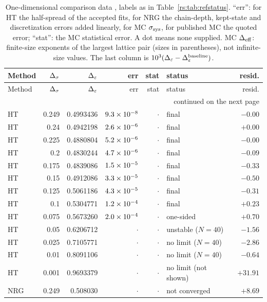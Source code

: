 {\small
\begin{longtable}{@{}l r r r r l r@{}}
\caption{One-dimensional comparison data \cite{rs:noteHT,rs:noteNRG,rs:noteMC,rs:Uzelac:2001lc,rs:Angelini:2014koy},
labels as in Table~\ref{rs:tab:refstatus}. ``err'': for HT the half-spread of the accepted fits,
for NRG the chain-depth, kept-state and discretization errors added linearly, for MC
$\sigma_{\rm sys}$, for published MC the quoted error; ``stat'': the MC statistical error. A dot
means none supplied. MC $\Delta_{\rm eff}$: finite-size exponents of the largest lattice pair
(sizes in parentheses), not infinite-size values. The last column is
$10^3(\Delta_\varepsilon-\Delta_\varepsilon^{\rm baseline})$.}\label{rs:tab:refs1d}\\
\toprule Method & $\Delta_\sigma$ & $\Delta_\varepsilon$ & err & stat & status & resid.\\ \midrule\endfirsthead
\toprule Method & $\Delta_\sigma$ & $\Delta_\varepsilon$ & err & stat & status & resid.\\ \midrule\endhead
\midrule\multicolumn{7}{r}{continued on the next page}\\\endfoot
\bottomrule\endlastfoot
HT & 0.249 & 0.4993436 & $9.3\times10^{-8}$ & $\cdot$ & final & $-0.00$\\
HT & 0.24 & 0.4942198 & $2.6\times10^{-6}$ & $\cdot$ & final & $+0.00$\\
HT & 0.225 & 0.4880804 & $5.2\times10^{-6}$ & $\cdot$ & final & $-0.00$\\
HT & 0.2 & 0.4830244 & $4.7\times10^{-6}$ & $\cdot$ & final & $-0.09$\\
HT & 0.175 & 0.4839086 & $1.5\times10^{-5}$ & $\cdot$ & final & $-0.33$\\
HT & 0.15 & 0.4912086 & $3.3\times10^{-5}$ & $\cdot$ & final & $-0.50$\\
HT & 0.125 & 0.5061186 & $4.3\times10^{-5}$ & $\cdot$ & final & $-0.31$\\
HT & 0.1 & 0.5304771 & $1.2\times10^{-4}$ & $\cdot$ & final & $+0.23$\\
HT & 0.075 & 0.5673260 & $2.0\times10^{-4}$ & $\cdot$ & one-sided & $+0.70$\\
HT & 0.05 & 0.6206712 & $\cdot$ & $\cdot$ & unstable ($N=40$) & $-1.56$\\
HT & 0.025 & 0.7105771 & $\cdot$ & $\cdot$ & no limit ($N=40$) & $-2.86$\\
HT & 0.01 & 0.8091106 & $\cdot$ & $\cdot$ & no limit ($N=40$) & $-0.64$\\
HT & 0.001 & 0.9693379 & $\cdot$ & $\cdot$ & no limit (not shown) & $+31.91$\\
NRG & 0.249 & 0.508030 & $\cdot$ & $\cdot$ & not converged & $+8.69$\\

\end{longtable}}
